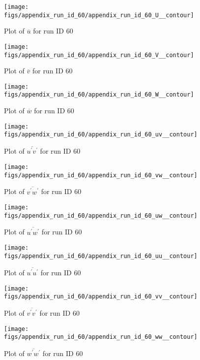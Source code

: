 \begin{figure}[H]
\centering
\texttt{[image: figs/appendix\_run\_id\_60/appendix\_run\_id\_60\_U\_\_contour]}
\caption{Plot of $\overline{u}$ for run ID 60}
\label{fig:appendix_run_id_60_U__contour}
\end{figure}


\begin{figure}[H]
\centering
\texttt{[image: figs/appendix\_run\_id\_60/appendix\_run\_id\_60\_V\_\_contour]}
\caption{Plot of $\overline{v}$ for run ID 60}
\label{fig:appendix_run_id_60_V__contour}
\end{figure}


\begin{figure}[H]
\centering
\texttt{[image: figs/appendix\_run\_id\_60/appendix\_run\_id\_60\_W\_\_contour]}
\caption{Plot of $\overline{w}$ for run ID 60}
\label{fig:appendix_run_id_60_W__contour}
\end{figure}


\begin{figure}[H]
\centering
\texttt{[image: figs/appendix\_run\_id\_60/appendix\_run\_id\_60\_uv\_\_contour]}
\caption{Plot of $\overline{u^\prime v^\prime}$ for run ID 60}
\label{fig:appendix_run_id_60_uv__contour}
\end{figure}


\begin{figure}[H]
\centering
\texttt{[image: figs/appendix\_run\_id\_60/appendix\_run\_id\_60\_vw\_\_contour]}
\caption{Plot of $\overline{v^\prime w^\prime}$ for run ID 60}
\label{fig:appendix_run_id_60_vw__contour}
\end{figure}


\begin{figure}[H]
\centering
\texttt{[image: figs/appendix\_run\_id\_60/appendix\_run\_id\_60\_uw\_\_contour]}
\caption{Plot of $\overline{u^\prime w^\prime}$ for run ID 60}
\label{fig:appendix_run_id_60_uw__contour}
\end{figure}


\begin{figure}[H]
\centering
\texttt{[image: figs/appendix\_run\_id\_60/appendix\_run\_id\_60\_uu\_\_contour]}
\caption{Plot of $\overline{u^\prime u^\prime}$ for run ID 60}
\label{fig:appendix_run_id_60_uu__contour}
\end{figure}


\begin{figure}[H]
\centering
\texttt{[image: figs/appendix\_run\_id\_60/appendix\_run\_id\_60\_vv\_\_contour]}
\caption{Plot of $\overline{v^\prime v^\prime}$ for run ID 60}
\label{fig:appendix_run_id_60_vv__contour}
\end{figure}


\begin{figure}[H]
\centering
\texttt{[image: figs/appendix\_run\_id\_60/appendix\_run\_id\_60\_ww\_\_contour]}
\caption{Plot of $\overline{w^\prime w^\prime}$ for run ID 60}
\label{fig:appendix_run_id_60_ww__contour}
\end{figure}


